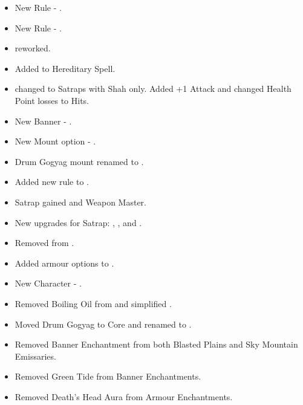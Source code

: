 

\subtitle{2022 beta 3}
\begin{multicols}{2}

\begin{itemize}
	\item New Rule - \hobcohesion{}.
	\item New Rule - \regimentalmascot{}.
	\item \ironrain{} reworked.
	\item Added \fearless{} to Hereditary Spell.
	\item \wickedserrations{} changed to Satraps with Shah only. Added +1 Attack and changed Health Point losses to Hits.
	\item New Banner - \baitedbanner{}.
	\item New Mount option - \colossalcamel{}.
	\item Drum Gogyag mount renamed to \royalgogyag{}.
	\item Added new rule \royalgogyagbarding{} to \royalgogyag{}.
	\item Satrap gained \hobcohesion{} and Weapon Master.
	\item New upgrades for Satrap: \cavalrycommander{}, \archerycommander{}, and \shah{}.
	\item Removed \ironrain{} from \hobgoblinconjurer{}.
	\item Added armour options to \hobgoblinconjurer{}.
	\item New Character - \hobsavaran{}.
	\item Removed Boiling Oil from \hobauxiliaries{} and simplified \disciples{}.
	\item Moved Drum Gogyag to Core and renamed to \regimentalgogyag{}.
	\item Removed Banner Enchantment from both Blasted Plains and Sky Mountain Emissaries.
	\item Removed Green Tide from Banner Enchantments.
	\item Removed Death’s Head Aura from Armour Enchantments.
\end{itemize}
\vfill\null
\columnbreak
{}
	

\end{multicols}
